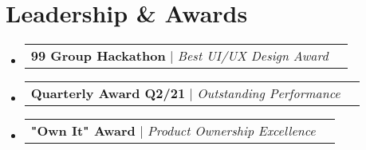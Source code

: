 \documentclass[a4paper, 11pt]{article}
\makeatletter
\newcommand{\resumeProjectHeading}[2]{
    \item
    \begin{tabular*}{0.987\textwidth}{l@{\extracolsep{\fill}}r}
      \small#1\\
    \end{tabular*}\vspace{-7pt}
}
\newcommand{\resumeSubHeadingListStart}{\begin{itemize}[leftmargin=0.1in, label={}]}
\newcommand{\resumeSubHeadingListEnd}{\end{itemize}\vspace{5pt}}
\makeatother
\begin{document}
\section{Leadership \& Awards}
    \resumeSubHeadingListStart
        \resumeProjectHeading
            {\textbf{99 Group Hackathon} $|$ \emph{Best UI/UX Design Award}}{2021}
        \resumeProjectHeading
            {\textbf{Quarterly Award Q2/21} $|$ \emph{Outstanding Performance}}{2021}
        \resumeProjectHeading
            {\textbf{"Own It" Award} $|$ \emph{Product Ownership Excellence}}{99.co}
    \resumeSubHeadingListEnd
\end{document}

